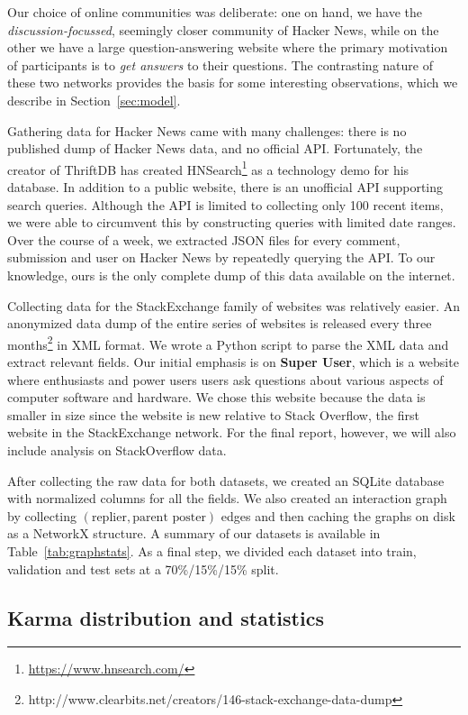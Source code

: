 \documentclass[11pt]{article}
\begin{document}
Our choice of online communities was deliberate: one on hand, we have the
\emph{discussion-focussed}, seemingly closer community of Hacker News, while on
the other we have a large question-answering website where the primary
motivation of participants is to \emph{get answers} to their questions. The
contrasting nature of these two networks provides the basis for some interesting
observations, which we describe in Section~\ref{sec:model}.

Gathering data for Hacker News came with many challenges: there is no published
dump of Hacker News data, and no official API. Fortunately, the creator of
ThriftDB has created HNSearch\footnote{\url{https://www.hnsearch.com/}} as a
technology demo for his database. In addition to a public website, there is an
unofficial API supporting search queries. Although the API is limited to
collecting only 100 recent items, we were able to circumvent this by
constructing queries with limited date ranges. Over the course of a week, we
extracted JSON files for every comment, submission and user on Hacker News by
repeatedly querying the API\@. To our knowledge, ours is the only complete dump
of this data available on the internet.

Collecting data for the StackExchange family of websites was relatively easier.
An anonymized data dump of the entire series of websites is released every three
months\footnote{http://www.clearbits.net/creators/146-stack-exchange-data-dump}
in XML format. We wrote a Python script to parse the XML data and extract
relevant fields. Our initial emphasis is on \textbf{Super User}, which is a
website where enthusiasts and power users users ask questions about various
aspects of computer software and hardware. We chose this website because the
data is smaller in size since the website is new relative to Stack Overflow, the
first website in the StackExchange network. For the final report, however, we
will also include analysis on StackOverflow data.

After collecting the raw data for both datasets, we created an SQLite database
with normalized columns for all the fields. We also created an interaction graph
by collecting $(\text{replier}, \text{parent poster})$ edges and then caching
the graphs on disk as a NetworkX structure. A summary of our datasets is
available in Table~\ref{tab:graphstats}. As a final step, we divided each
dataset into train, validation and test sets at a 70\%/15\%/15\% split.

\subsection{Karma distribution and statistics}
\end{document}
